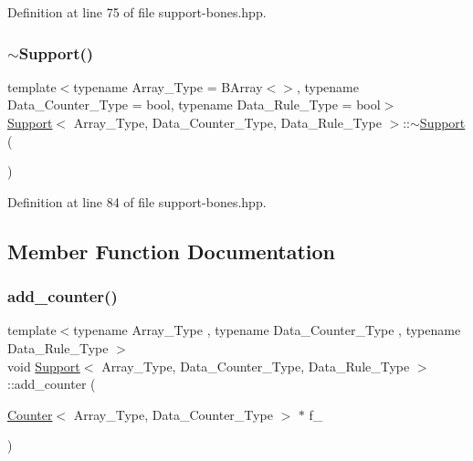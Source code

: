 Definition at line 75 of file support-\/bones.\+hpp.

\mbox{\label{class_support_a9c5f33ac43d962272b616948dec5d825}} 
\subsubsection{\texorpdfstring{$\sim$\+Support()}{~Support()}}
{\footnotesize\ttfamily template$<$typename Array\+\_\+\+Type = B\+Array$<$$>$, typename Data\+\_\+\+Counter\+\_\+\+Type = bool, typename Data\+\_\+\+Rule\+\_\+\+Type = bool$>$ \\
\hyperlink{class_support}{Support}$<$ Array\+\_\+\+Type, Data\+\_\+\+Counter\+\_\+\+Type, Data\+\_\+\+Rule\+\_\+\+Type $>$\+::$\sim$\hyperlink{class_support}{Support} (\begin{DoxyParamCaption}{ }\end{DoxyParamCaption})\hspace{0.3cm}{\ttfamily [inline]}}



Definition at line 84 of file support-\/bones.\+hpp.



\subsection{Member Function Documentation}
\mbox{\label{class_support_a364df2c6295341f2801ebe0419d1d97c}} 
\subsubsection{\texorpdfstring{add\+\_\+counter()}{add\_counter()}\hspace{0.1cm}{\footnotesize\ttfamily [1/2]}}
{\footnotesize\ttfamily template$<$typename Array\+\_\+\+Type , typename Data\+\_\+\+Counter\+\_\+\+Type , typename Data\+\_\+\+Rule\+\_\+\+Type $>$ \\
void \hyperlink{class_support}{Support}$<$ Array\+\_\+\+Type, Data\+\_\+\+Counter\+\_\+\+Type, Data\+\_\+\+Rule\+\_\+\+Type $>$\+::add\+\_\+counter (\begin{DoxyParamCaption}\item[{\hyperlink{class_counter}{Counter}$<$ Array\+\_\+\+Type, Data\+\_\+\+Counter\+\_\+\+Type $>$ $\ast$}]{f\+\_\+ }\end{DoxyParamCaption})\hspace{0.3cm}{\ttfamily [inline]}}



